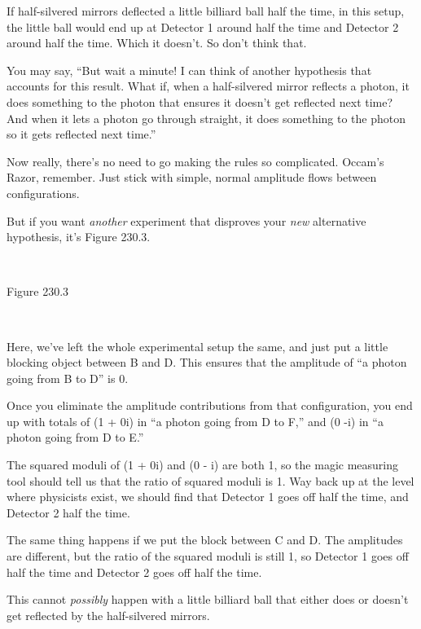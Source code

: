 {
 If half-silvered mirrors deflected a little billiard ball half the
time, in this setup, the little ball would end up at Detector 1 around
half the time and Detector 2 around half the time. Which it
doesn't. So don't think that.}

{
 You may say, ``But wait a minute! I can think of
another hypothesis that accounts for this result. What if, when a
half-silvered mirror reflects a photon, it does something to the photon
that ensures it doesn't get reflected next time? And
when it lets a photon go through straight, it does something to the
photon so it gets reflected next time.''}

{
 Now really, there's no need to go making the rules
so complicated. Occam's Razor, remember. Just stick
with simple, normal amplitude flows between configurations.}

{
 But if you want \textit{another} experiment that disproves your
\textit{new} alternative hypothesis, it's Figure
230.3.}

{
 ~}

{\centering
{}
 \newline
 Figure 230.3
\par}


\bigskip

{
 ~}

{
 Here, we've left the whole experimental setup the
same, and just put a little blocking object between B and D. This
ensures that the amplitude of ``a photon going from B
to D'' is 0.}

{
 Once you eliminate the amplitude contributions from that
configuration, you end up with totals of (1 + 0i) in
``a photon going from D to F,'' and
(0 -i) in ``a photon going from D to
E.''}

{
 The squared moduli of (1 + 0i) and (0 - i) are both 1, so the
magic measuring tool should tell us that the ratio of squared moduli is
1. Way back up at the level where physicists exist, we should find that
Detector 1 goes off half the time, and Detector 2 half the time.}

{
 The same thing happens if we put the block between C and D. The
amplitudes are different, but the ratio of the squared moduli is still
1, so Detector 1 goes off half the time and Detector 2 goes off half
the time.}

{
 This cannot \textit{possibly} happen with a little billiard ball
that either does or doesn't get reflected by the
half-silvered mirrors.}

